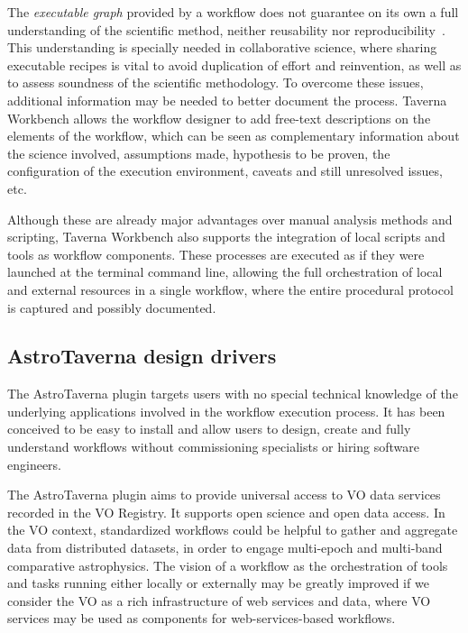 \documentclass{aa}
\begin{document}
The \textit{executable graph} provided by a workflow does not guarantee on its own a full understanding of the scientific method, neither reusability nor reproducibility~\citep{WfRO:SePublica2012}. This understanding is specially needed in collaborative science, where sharing executable recipes is vital to avoid duplication of effort and reinvention, as well as to assess soundness of the scientific methodology. To overcome these issues, additional information may be needed to better document the process. Taverna Workbench allows the workflow designer to add free-text descriptions on the elements of the workflow, which can be seen as complementary information about the science involved, assumptions made, hypothesis to be proven, the configuration of the execution environment, caveats and still unresolved issues, etc.

Although these are already major advantages over manual analysis methods and scripting, Taverna Workbench also supports the integration of local scripts and tools as workflow components. These processes are executed as if they were launched at the terminal command line, allowing the full orchestration of local and external resources in a single workflow, where the entire procedural protocol is captured and possibly documented. 


\subsection{AstroTaverna design drivers}
\label{Drivers}

The AstroTaverna plugin targets users with no special technical knowledge of the underlying applications involved in the workflow execution process. It has been conceived to be easy to install and allow users to design, create and fully understand workflows without commissioning specialists or hiring software engineers. 

The AstroTaverna plugin aims to provide universal access to VO data services recorded in the VO Registry. It supports open science and open data access. In the VO context, standardized workflows could be helpful to gather and aggregate data from distributed datasets, in order to engage multi-epoch and multi-band comparative astrophysics. The vision of a workflow as the orchestration of tools and tasks running either locally or externally may be greatly improved if we consider the VO as a rich infrastructure of web services and data, where VO services may be used as components for web-services-based workflows. 
\end{document}
